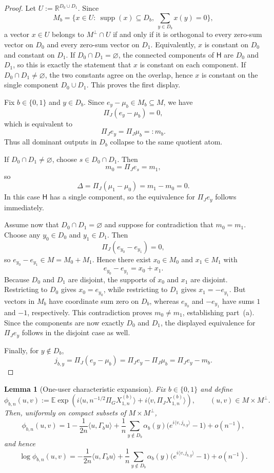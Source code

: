 \documentclass{article}
\newtheorem{lemma}[theorem]{Lemma}
\newcommand{\1}{\mathbf 1}
\DeclareMathOperator{\supp}{supp}
\begin{document}
\begin{proof}
Let $U:=\mathbb R^{D_0\cup D_1}$. Since
\[
M_b=\{x\in U:\ \supp(x)\subseteq D_b,\ \sum_{y\in D_b}x(y)=0\},
\]
a vector $x\in U$ belongs to $M^\perp\cap U$ if and only if it is orthogonal to every zero-sum vector on $D_0$ and
every zero-sum vector on $D_1$. Equivalently, $x$ is constant on $D_0$ and constant on $D_1$. If $D_0\cap D_1=
\varnothing$, the connected components of $\mathsf H$ are $D_0$ and $D_1$, so this is exactly the statement that $x$
is constant on each component. If $D_0\cap D_1\neq\varnothing$, the two constants agree on the overlap, hence $x$ is
constant on the single component $D_0\cup D_1$. This proves the first display.

Fix $b\in\{0,1\}$ and $y\in D_b$. Since $e_y-\mu_b\in M_b\subseteq M$, we have
\[
\Pi_J(e_y-\mu_b)=0,
\]
which is equivalent to
\[
\Pi_J e_y=\Pi_J\mu_b=:m_b.
\]
Thus all dominant outputs in $D_b$ collapse to the same quotient atom.

If $D_0\cap D_1\neq\varnothing$, choose $s\in D_0\cap D_1$. Then
\[
m_0=\Pi_J e_s=m_1,
\]
so
\[
\Delta=\Pi_J(\mu_1-\mu_0)=m_1-m_0=0.
\]
In this case $\mathsf H$ has a single component, so the equivalence for $\Pi_J e_y$ follows immediately.

Assume now that $D_0\cap D_1=\varnothing$ and suppose for contradiction that $m_0=m_1$. Choose any
$y_0\in D_0$ and $y_1\in D_1$. Then
\[
\Pi_J(e_{y_0}-e_{y_1})=0,
\]
so $e_{y_0}-e_{y_1}\in M=M_0+M_1$. Hence there exist $x_0\in M_0$ and $x_1\in M_1$ with
\[
e_{y_0}-e_{y_1}=x_0+x_1.
\]
Because $D_0$ and $D_1$ are disjoint, the supports of $x_0$ and $x_1$ are disjoint. Restricting to $D_0$ gives
$x_0=e_{y_0}$, while restricting to $D_1$ gives $x_1=-e_{y_1}$. But vectors in $M_b$ have coordinate sum zero on
$D_b$, whereas $e_{y_0}$ and $-e_{y_1}$ have sums $1$ and $-1$, respectively. This contradiction proves $m_0\neq
m_1$, establishing part~(a). Since the components are now exactly $D_0$ and $D_1$, the displayed equivalence for
$\Pi_J e_y$ follows in the disjoint case as well.

Finally, for $y\notin D_b$,
\[
j_{b,y}=\Pi_J(e_y-\mu_b)=\Pi_J e_y-\Pi_J\mu_b=\Pi_J e_y-m_b.
\]
\end{proof}

\begin{lemma}[One-user characteristic expansion]
\label{lem:new-one-user-cf}
Fix $b\in\{0,1\}$ and define
\[
\phi_{b,n}(u,v)
:=
\mathbb E\exp\!\left(
 i\bigl\langle u,n^{-1/2}\Pi_G X^{(b)}_{1,n}\bigr\rangle
 +i\bigl\langle v,\Pi_J X^{(b)}_{1,n}\bigr\rangle
\right),
\qquad (u,v)\in M\times M^\perp.
\]
Then, uniformly on compact subsets of $M\times M^\perp$,
\[
\phi_{b,n}(u,v)
=
1
-\frac{1}{2n}\langle u,\Gamma_b u\rangle
+\frac{1}{n}\sum_{y\notin D_b}\alpha_b(y)\bigl(e^{i\langle v,j_{b,y}\rangle}-1\bigr)
+o(n^{-1}),
\]
and hence
\[
\log\phi_{b,n}(u,v)
=
-\frac{1}{2n}\langle u,\Gamma_b u\rangle
+\frac{1}{n}\sum_{y\notin D_b}\alpha_b(y)\bigl(e^{i\langle v,j_{b,y}\rangle}-1\bigr)
+o(n^{-1}).
\]
\end{lemma}
\end{document}
